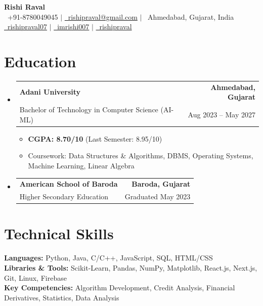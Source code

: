 \documentclass[letterpaper,10pt]{article}
\makeatletter
\newcommand{\resumeItem}[1]{
  \item\small{
    {#1 \vspace{-2pt}}
  }
}
\newcommand{\resumeSubheading}[4]{
  \vspace{-1pt}\item
    \begin{tabular*}{1.0\textwidth}[t]{l@{\extracolsep{\fill}}r}
      \textbf{\color{primaryColor}#1} & \textbf{\small\color{subtitleColor} #2} \\
      {\small\color{subtitleColor}#3} & {\small\color{subtitleColor} #4} \\
    \end{tabular*}\vspace{-5pt}
}
\newcommand{\resumeSubHeadingListStart}{\begin{itemize}[leftmargin=0.0in, label={}]}
\newcommand{\resumeSubHeadingListEnd}{\end{itemize}}
\newcommand{\resumeItemListStart}{\begin{itemize}[leftmargin=0.15in]}
\newcommand{\resumeItemListEnd}{\end{itemize}\vspace{-3pt}}
\newcommand{\skill}[1]{\small{#1}}
\makeatother
\begin{document}
\begin{center}
    {\Huge\bfseries\color{primaryColor} Rishi Raval} \\ 
    \vspace{6pt}
    \small\color{subtitleColor}
    \faPhone\ +91-8780049045 \hspace{8pt} $\vert$ \hspace{8pt}
    \href{mailto:rishipraval@gmail.com}{\faEnvelope\ rishipraval@gmail.com} \hspace{8pt} $\vert$ \hspace{8pt}
    \faMapMarker\ Ahmedabad, Gujarat, India \\ 
    \vspace{4pt}
    \href{https://linkedin.com/in/rishipraval07}{\faLinkedin\ rishipraval07} \hspace{8pt} $\vert$ \hspace{8pt}
    \href{https://github.com/imrishi007}{\faGithub\ imrishi007} \hspace{8pt} $\vert$ \hspace{8pt}
    \href{https://leetcode.com/u/rishipraval}{\faCode\ rishipraval}
\end{center}

\vspace{6pt}

\section{Education}
  \resumeSubHeadingListStart
    \resumeSubheading
      {Adani University}{Ahmedabad, Gujarat}
      {Bachelor of Technology in Computer Science (AI-ML)}{Aug 2023 -- May 2027}
      \resumeItemListStart
        \resumeItem{\textbf{CGPA: 8.70/10} (Last Semester: 8.95/10)}
        \resumeItem{Coursework: Data Structures \& Algorithms, DBMS, Operating Systems, Machine Learning, Linear Algebra}
      \resumeItemListEnd
      
    \resumeSubheading
      {American School of Baroda}{Baroda, Gujarat}
      {Higher Secondary Education}{Graduated May 2023}
  \resumeSubHeadingListEnd

\vspace{8pt}

\section{Technical Skills}
 \begin{itemize}[leftmargin=0.15in, label={}]
    \small{\item{
     \textbf{Languages:} \skill{Python, Java, C/C++, JavaScript, SQL, HTML/CSS} \\[3pt]
     \textbf{Libraries \& Tools:} \skill{Scikit-Learn, Pandas, NumPy, Matplotlib, React.js, Next.js, Git, Linux, Firebase} \\[3pt]
     \textbf{Key Competencies:} \skill{Algorithm Development, Credit Analysis, Financial Derivatives, Statistics, Data Analysis}
    }}
 \end{itemize}
\end{document}
